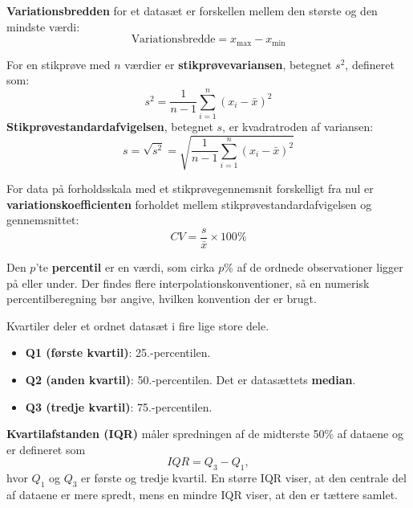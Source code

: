 \begin{definition}[Variationsbredde]
\textbf{Variationsbredden} for et datasæt er forskellen mellem den største og den mindste værdi:
\[
\text{Variationsbredde} = x_{\max} - x_{\min}
\]
\end{definition}

\begin{definition}
For en stikprøve med $n$ værdier er \textbf{stikprøvevariansen}, betegnet $s^2$, defineret som:
$$
s^2 = \frac{1}{n-1}\sum_{i=1}^{n}(x_i - \bar{x})^2
$$
\textbf{Stikprøvestandardafvigelsen}, betegnet $s$, er kvadratroden af variansen:
$$
s = \sqrt{s^2} = \sqrt{\frac{1}{n-1}\sum_{i=1}^{n}(x_i - \bar{x})^2}
$$
\end{definition}

\begin{definition}[Variationskoefficient]
For data på forholdsskala med et stikprøvegennemsnit forskelligt fra nul er \textbf{variationskoefficienten} forholdet mellem stikprøvestandardafvigelsen og gennemsnittet:
\[
CV = \frac{s}{\bar{x}} \times 100\%
\]
\end{definition}

\begin{definition}[Percentil]
Den $p$'te \textbf{percentil} er en værdi, som cirka $p\%$ af de ordnede observationer ligger på eller under. Der findes flere interpolationskonventioner, så en numerisk percentilberegning bør angive, hvilken konvention der er brugt.
\end{definition}

\begin{definition}[Kvartiler]

Kvartiler deler et ordnet datasæt i fire lige store dele.

\begin{itemize}
    \item \textbf{Q1 (første kvartil)}: 25.-percentilen.
    \item \textbf{Q2 (anden kvartil)}: 50.-percentilen. Det er datasættets \textbf{median}.
    \item \textbf{Q3 (tredje kvartil)}: 75.-percentilen.
\end{itemize}
\end{definition}

\begin{definition}[Kvartilafstand]
    \textbf{Kvartilafstanden (IQR)} måler spredningen af de midterste 50\% af dataene og er defineret som
    $$
    IQR = Q_3 - Q_1,
    $$
    hvor $Q_1$ og $Q_3$ er første og tredje kvartil. En større IQR viser, at den centrale del af dataene er mere spredt, mens en mindre IQR viser, at den er tættere samlet.
\end{definition}

